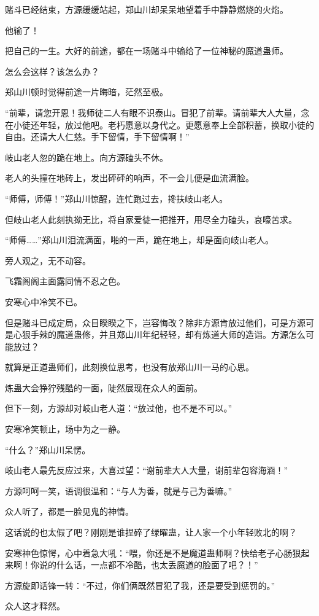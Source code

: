 \begin{this_body}
赌斗已经结束，方源缓缓站起，郑山川却呆呆地望着手中静静燃烧的火焰。

他输了！

把自己的一生。大好的前途，都在一场赌斗中输给了一位神秘的魔道蛊师。

怎么会这样？该怎么办？

郑山川顿时觉得前途一片晦暗，茫然至极。

“前辈，请您开恩！我师徒二人有眼不识泰山。冒犯了前辈。请前辈大人大量，念在小徒还年轻，放过他吧。老朽愿意以身代之。更愿意奉上全部积蓄，换取小徒的自由。还请大人仁慈。手下留情，手下留情啊！”

岐山老人忽的跪在地上。向方源磕头不休。

老人的头撞在地砖上，发出砰砰的响声，不一会儿便是血流满脸。

“师傅，师傅！”郑山川惊醒，连忙跑过去，搀扶岐山老人。

但岐山老人此刻执拗无比，将自家爱徒一把推开，用尽全力磕头，哀嚎苦求。

“师傅……”郑山川泪流满面，啪的一声，跪在地上，却是面向岐山老人。

旁人观之，无不动容。

飞霜阁阁主面露同情不忍之色。

安寒心中冷笑不已。

但是赌斗已成定局，众目睽睽之下，岂容悔改？除非方源肯放过他们，可是方源可是心狠手辣的魔道蛊修，并且郑山川年纪轻轻，却有炼道大师的造诣。方源怎么可能放过？

就算是正道蛊师们，此刻换位思考，也没有放郑山川一马的心思。

炼蛊大会狰狞残酷的一面，陡然展现在众人的面前。

但下一刻，方源却对岐山老人道：“放过他，也不是不可以。”

安寒冷笑顿止，场中为之一静。

“什么？”郑山川呆愣。

岐山老人最先反应过来，大喜过望：“谢前辈大人大量，谢前辈包容海涵！”

方源呵呵一笑，语调很温和：“与人为善，就是与己为善嘛。”

众人听了，都是一脸见鬼的神情。

这话说的也太假了吧？刚刚是谁捏碎了绿曜蛊，让人家一个小年轻败北的啊？

安寒神色惊愕，心中着急大吼：“喂，你还是不是魔道蛊师啊？快给老子心肠狠起来啊！你说的什么话，一点都不冷酷，也太丢魔道的脸面了吧？！”

方源旋即话锋一转：“不过，你们俩既然冒犯了我，还是要受到惩罚的。”

众人这才释然。


\end{this_body}

